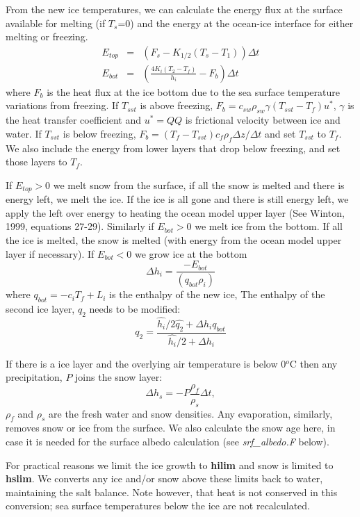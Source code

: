 From the new ice temperatures, we can calculate
the energy flux at the surface available for melting (if $T_s$=0)
and the energy at the ocean-ice interface for either melting or freezing.
\begin{eqnarray}
E_{top} &  =  & (F_s- K_{1/2}(T_s-T_1) ) \Delta t
\nonumber \\
E_{bot} &= & (\frac{4K_i(T_2-T_f)}{h_i}-F_b) \Delta t
\nonumber
\end{eqnarray}
where $F_b$ is the heat flux at the ice bottom due to the sea surface
temperature variations from freezing.
If $T_{sst}$ is above freezing, $F_b=c_{sw} \rho_{sw} 
\gamma (T_{sst}-T_f)u^{*}$, $\gamma$ is the heat transfer coefficient
and $u^{*}=QQ$ is frictional velocity between ice 
and water. If $T_{sst}$ is below freezing,
$F_b=(T_f - T_{sst})c_f \rho_f \Delta z /\Delta t$ and set $T_{sst}$
to $T_f$. We also
include the energy from lower layers that drop below freezing,
and set those layers to $T_f$.

If $E_{top}>0$ we melt snow from the surface, if all the snow is melted
and there is energy left, we melt the ice. If the ice is all gone
and there is still energy left, we apply the left over energy to 
heating the ocean model upper layer (See Winton, 1999, equations 27-29).
Similarly if $E_{bot}>0$ we melt ice from the bottom. If all the ice
is melted, the snow is melted (with energy from the ocean model upper layer
if necessary). If $E_{bot}<0$ we grow ice at the bottom
\[
\Delta h_i = \frac{-E_{bot}}{(q_{bot} \rho_i)}
\]
where $q_{bot}=-c_{i} T_f + L_i$ is the enthalpy of the new ice,
The enthalpy of the second ice layer, $q_2$ needs to be modified:
\[
q_2 = \frac{ \hat{h_i}/2 \hat{q_2} + \Delta h_i q_{bot} }
        {\hat{h_i}/{2}+\Delta h_i}
\]

If there is a ice layer and the overlying air temperature is
below 0$^o$C then any precipitation, $P$ joins the snow layer:
\[
\Delta h_s  = -P \frac{\rho_f}{\rho_s} \Delta t, 
\]
$\rho_f$ and $\rho_s$ are the fresh water and snow densities.
Any evaporation, similarly, removes snow or ice from the surface.
We also calculate the snow age here, in case it is needed for
the surface albedo calculation (see {\it srf\_albedo.F} below).

For practical reasons we limit the ice growth to {\bf hilim}
and snow is limited to {\bf hslim}. We converts any
ice and/or snow above these limits back to water, maintaining the salt
balance. Note however, that heat is not conserved in this
conversion; sea surface temperatures below the ice are not
recalculated.

